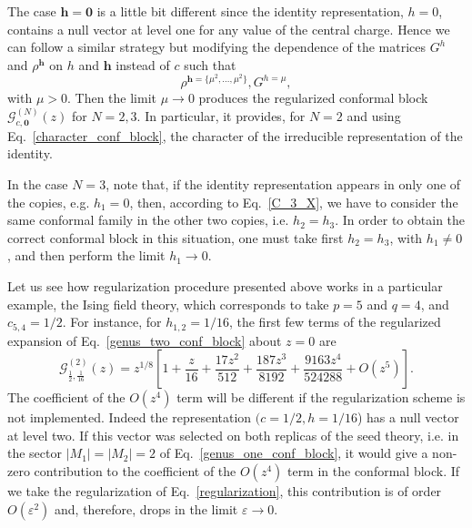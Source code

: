 \documentclass[a4paper,11pt]{article}
\begin{document}
The case $\boldsymbol{h}=\boldsymbol{0}$ is a little bit different since the identity representation,
$h=0$, contains a null vector at level one for any value of the central charge. Hence we can follow 
a similar strategy but modifying the dependence of the matrices $G^{h}$ and $\rho^{\boldsymbol{h}}$
on $h$ and $\boldsymbol{h}$ instead of $c$ such that
\begin{equation}\label{regularization_identity}
 \rho^{\boldsymbol{h}=\{\mu^2,\dots, \mu^2\}}, G^{h=\mu},
\end{equation}
with $\mu>0$. Then the limit $\mu\to 0$ produces the regularized conformal block 
$\mathcal{G}_{c, \boldsymbol{0}}^{(N)}(z)$ for $N=2,3$. In particular, it provides, 
for $N=2$ and using Eq.~\eqref{character_conf_block}, the  character of the irreducible 
representation of the identity.

In the case $N=3$, note that, if the identity representation appears in only one of the copies, 
e.g. $h_1=0$, then, according to Eq.~\eqref{C_3_X},  we have to consider the same conformal family in the 
other two copies, i.e. $h_2=h_3$.  In order to obtain the correct conformal block in this situation,
one must take first $h_2=h_3$, with $h_1\neq 0$, and then perform the limit $h_1\to 0$. 

Let us see how regularization procedure presented above works in a particular example, the Ising field 
theory, which corresponds to take $p=5$ and $q=4$, and $c_{5, 4}=1/2$. For instance, for $h_{1, 2}=1/16$, 
the first few terms of the regularized expansion of Eq.~\eqref{genus_two_conf_block} about $z=0$ are 
\begin{equation}
 \mathcal{G}_{\frac{1}{2}, \frac{1}{16}}^{(2)}(z)=z^{1/8}
 \left[1+\frac{z}{16}+\frac{17z^2}{512}+\frac{187z^3}{8192}+\frac{9163z^4}{524288}+O(z^5)\right].
\end{equation}
The coefficient of the $O(z^4)$ term will be different if the regularization scheme is not implemented.
Indeed the representation $(c=1/2, h=1/16$) has a null vector at level two. If this vector was selected on both
replicas of the seed theory, i.e. in the sector $|M_1|=|M_2|=2$ of Eq.~\eqref{genus_one_conf_block}, it 
would give a non-zero contribution to the coefficient of the $O(z^4)$ term in the conformal block. 
If we take the regularization of Eq.~\eqref{regularization}, this contribution is of order $O(\varepsilon^2)$
and, therefore, drops in the limit $\varepsilon\to 0$.
\end{document}
